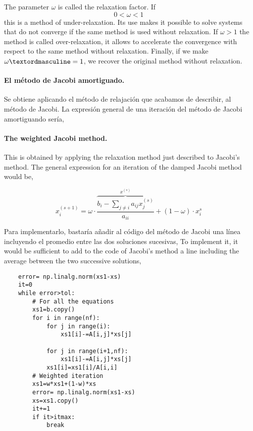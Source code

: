 \begin{paracol}{2}
The parameter $\omega$ is called the relaxation factor. If $$0<\omega<1$$ this is a method of under-relaxation. Its use makes it possible to solve systems that do not converge if the same method is used without relaxation. If $\omega>1$ the method is called over-relaxation, it allows to accelerate the convergence with respect to the same method without relaxation. Finally, if we make $\omegaº=1$, we recover the original method without relaxation.

\switchcolumn

\paragraph{El método de Jacobi amortiguado.}  Se obtiene aplicando el método de relajación que acabamos de describir, al método de Jacobi. La expresión general de una iteración del método de Jacobi amortiguando sería,

\switchcolumn
\paragraph{The weighted Jacobi method.} This is obtained by applying the relaxation method just described to Jacobi's method. The general expression for an iteration of the damped Jacobi method would be,
\end{paracol}

\begin{equation*}
x_i^{(s+1)}=\omega\cdot \overbrace{\frac{b_i-\sum_{j\neq i}a_{ij}x_j^{(s)}}{a_{ii}}}^{x^{(*)}}+(1- \omega)\cdot x_i^{s}
\end{equation*}

\begin{paracol}{2}
    Para implementarlo, bastaría añadir al código del método de Jacobi una línea incluyendo el promedio entre las dos soluciones sucesivas,
    \switchcolumn
To implement it, it would be sufficient to add to the code of Jacobi's method a line including the average between the two successive solutions,
\end{paracol}

\begin{verbatim}
    error= np.linalg.norm(xs1-xs)
    it=0
    while error>tol:
        # For all the equations
        xs1=b.copy()
        for i in range(nf):
            for j in range(i):
                xs1[i]-=A[i,j]*xs[j]

            for j in range(i+1,nf):
                xs1[i]-=A[i,j]*xs[j]
            xs1[i]=xs1[i]/A[i,i]
        # Weighted iteration
        xs1=w*xs1+(1-w)*xs
        error= np.linalg.norm(xs1-xs)
        xs=xs1.copy()
        it+=1
        if it>itmax:
            break
\end{verbatim}

